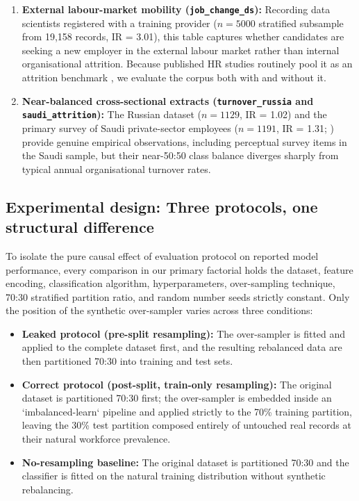 \documentclass[12pt,a4paper]{article}
\begin{document}
\begin{enumerate}
\item \textbf{External labour-market mobility (\texttt{job\_change\_ds}):} Recording data scientists registered with a training provider ($n = 5000$ stratified subsample from 19,158 records, IR = 3.01), this table captures whether candidates are seeking a new employer in the external labour market rather than internal organisational attrition. Because published HR studies routinely pool it as an attrition benchmark \parencite{ref18}, we evaluate the corpus both with and without it.
\item \textbf{Near-balanced cross-sectional extracts (\texttt{turnover\_russia} and \texttt{saudi\_attrition}):} The Russian dataset ($n = 1129$, IR = 1.02) and the primary survey of Saudi private-sector employees ($n = 1191$, IR = 1.31; \cite{ref4}) provide genuine empirical observations, including perceptual survey items in the Saudi sample, but their near-50:50 class balance diverges sharply from typical annual organisational turnover rates.
\end{enumerate}

\subsection{Experimental design: Three protocols, one structural difference}
To isolate the pure causal effect of evaluation protocol on reported model performance, every comparison in our primary factorial holds the dataset, feature encoding, classification algorithm, hyperparameters, over-sampling technique, 70:30 stratified partition ratio, and random number seeds strictly constant. Only the position of the synthetic over-sampler varies across three conditions:
\begin{itemize}
\item \textbf{Leaked protocol (pre-split resampling):} The over-sampler is fitted and applied to the complete dataset first, and the resulting rebalanced data are then partitioned 70:30 into training and test sets.
\item \textbf{Correct protocol (post-split, train-only resampling):} The original dataset is partitioned 70:30 first; the over-sampler is embedded inside an `imbalanced-learn` pipeline \parencite{ref22} and applied strictly to the 70\% training partition, leaving the 30\% test partition composed entirely of untouched real records at their natural workforce prevalence.
\item \textbf{No-resampling baseline:} The original dataset is partitioned 70:30 and the classifier is fitted on the natural training distribution without synthetic rebalancing.
\end{itemize}
\end{document}
